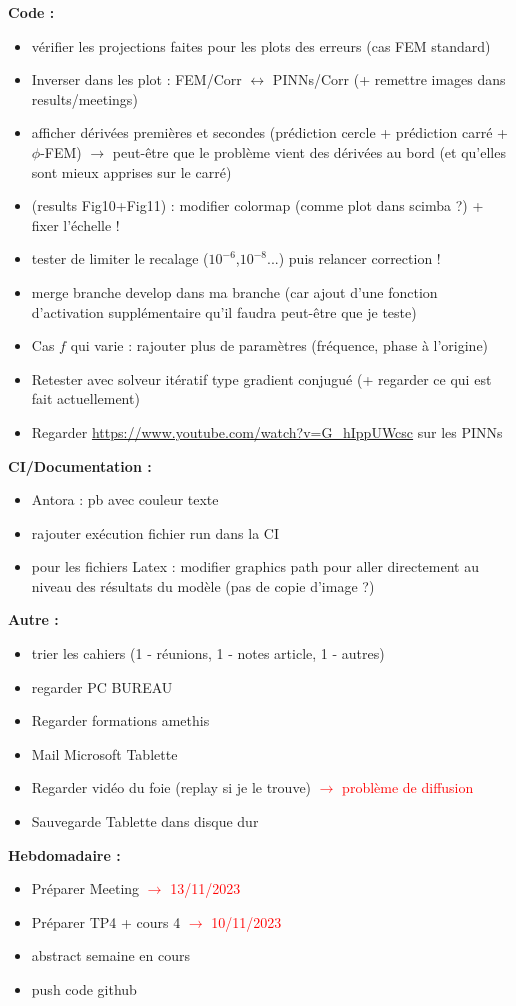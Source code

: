 \textbf{Code :}
\begin{itemize}[label=$\square$]
	\item vérifier les projections faites pour les plots des erreurs (cas FEM standard)
	\item Inverser dans les plot : FEM/Corr $\leftrightarrow$ PINNs/Corr (+ remettre images dans results/meetings)
	\item[\done] afficher dérivées premières et secondes (prédiction cercle + prédiction carré + $\phi$-FEM) $\rightarrow$ peut-être que le problème vient des dérivées au bord (et qu'elles sont mieux apprises sur le carré)
	\item (results Fig10+Fig11) : modifier colormap (comme plot dans scimba ?) + fixer l'échelle !
	\item tester de limiter le recalage ($10^{-6}$,$10^{-8}$...) puis relancer correction !
	\item merge branche develop dans ma branche (car ajout d'une fonction d'activation supplémentaire qu'il faudra peut-être que je teste)
	\item Cas $f$ qui varie : rajouter plus de paramètres (fréquence, phase à l'origine) 
	\item Retester avec solveur itératif type gradient conjugué (+ regarder ce qui est fait actuellement)
	\item Regarder \url{https://www.youtube.com/watch?v=G_hIppUWcsc} sur les PINNs
\end{itemize}
\textbf{CI/Documentation :}
\begin{itemize}[label=$\square$]
	\item Antora : pb avec couleur texte
	\item rajouter exécution fichier run dans la CI
	\item[\wontfix] pour les fichiers Latex : modifier graphics path pour aller directement au niveau des résultats du modèle (pas de copie d'image ?) 
\end{itemize}
\textbf{Autre :}
\begin{itemize}[label=$\square$]
	\item[\done] trier les cahiers (1 - réunions, 1 - notes article, 1 - autres)
	\item regarder PC BUREAU
	\item Regarder formations amethis
	\item[\done] Mail Microsoft Tablette
	\item[\wontfix] Regarder vidéo du foie (replay si je le trouve) \textcolor{red}{$\rightarrow$ problème de diffusion}
	\item Sauvegarde Tablette dans disque dur
\end{itemize}
\textbf{Hebdomadaire :}
\begin{itemize}[label=$\square$]
	\item[\done] Préparer Meeting \textcolor{red}{$\rightarrow$ 13/11/2023}
	\item[\done] Préparer TP4 + cours 4 \textcolor{red}{$\rightarrow$ 10/11/2023}
	\item abstract semaine en cours
	\item push code github
\end{itemize}